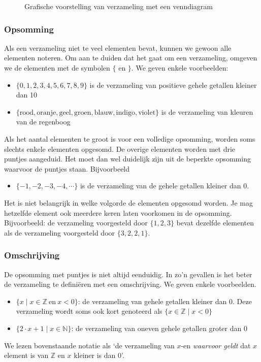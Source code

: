 \begin{figure}[htbp]
\centering
{}\qquad
{}
\caption{Grafische voorstelling van verzameling met een venndiagram}
\label{fig:venndiagram}
\end{figure}

\subsubsection{Opsomming}
Als een verzameling niet te veel elementen bevat, kunnen we gewoon alle elementen noteren. Om aan te duiden dat het gaat om een verzameling, omgeven we de elementen met de symbolen $\{$ en $\}$. We geven enkele voorbeelden:
\begin{itemize}
\item $\{0,1,2,3,4,5,6,7,8,9\}$ is de verzameling van positieve gehele getallen kleiner dan 10
\item $\{ \mathrm{ rood, oranje, geel, groen, blauw, indigo, violet}\}$ is de verzameling van kleuren van de regenboog
\end{itemize}
Als het aantal elementen te groot is voor een volledige opsomming, worden soms slechts enkele elementen opgesomd. De overige elementen worden met drie puntjes aangeduid. Het moet dan wel duidelijk zijn uit de beperkte opsomming waarvoor de puntjes staan. Bijvoorbeeld
\begin{itemize}
\item $\{-1,-2,-3,-4,\cdots \}$ is de verzameling van de gehele getallen kleiner dan 0.
\end{itemize}

Het is niet belangrijk in welke volgorde de elementen opgesomd worden. Je mag hetzelfde element ook meerdere keren laten voorkomen in de opsomming. Bijvoorbeeld: de verzameling voorgesteld door $\{1,2,3\}$ bevat dezelfde elementen als de verzameling voorgesteld door $\{3,2,2,1\}$.

\subsubsection{Omschrijving}
De opsomming met puntjes is niet altijd eenduidig. In zo'n gevallen is het beter de verzameling te defini\"eren met een omschrijving. We geven enkele voorbeelden.
\begin{itemize}
\item $\{x\mid x \in \mathbb{Z} ~\mathrm{ en }~ x<0\}$: de verzameling van gehele getallen kleiner dan 0. Deze verzameling wordt soms ook kort genoteerd als $\{x \in \mathbb{Z} \mid x<0\}$
\item $\{ 2\cdot x +1 \mid x \in \mathbb{N}\}$: de verzameling van oneven gehele getallen groter dan 0
\end{itemize}
We lezen bovenstaande notatie als `de verzameling van $x$-en \emph{waarvoor geldt} dat $x$ element is van $\mathbb{Z}$ en $x$ kleiner is dan 0'.


